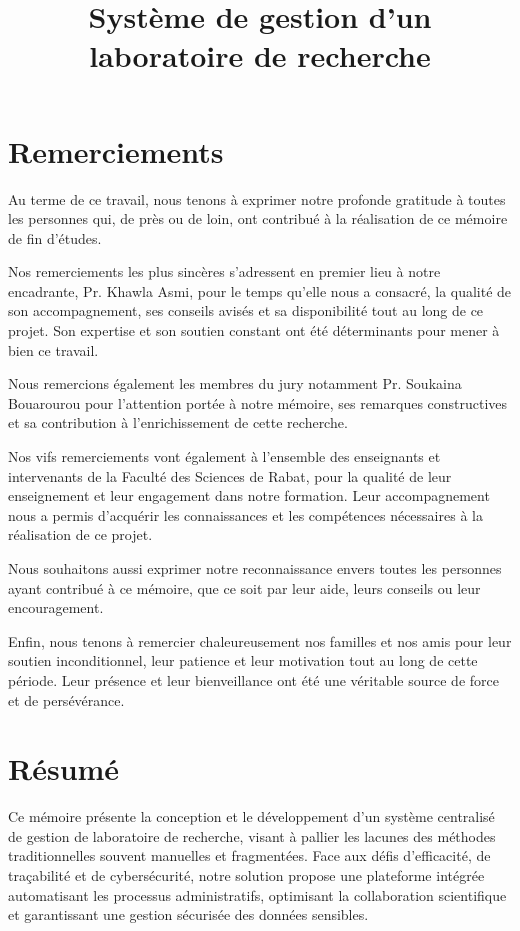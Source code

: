 \documentclass[12pt]{rapportPfe}
\title{Système de gestion d'un laboratoire de recherche}
\begin{document}

\fairepagedegarde
\fairemarges


\chapter*{Remerciements}
Au terme de ce travail, nous tenons à exprimer notre profonde gratitude à toutes les personnes qui, de près ou de loin, ont contribué à la réalisation de ce mémoire de fin d’études.

Nos remerciements les plus sincères s’adressent en premier lieu à notre encadrante, Pr. Khawla Asmi, pour le temps qu’elle nous a consacré, la qualité de son accompagnement, ses conseils avisés et sa disponibilité tout au long de ce projet. Son expertise et son soutien constant ont été déterminants pour mener à bien ce travail.

Nous remercions également les membres du jury notamment Pr. Soukaina Bouarourou pour l’attention portée à notre mémoire, ses remarques constructives et sa contribution à l’enrichissement de cette recherche.

Nos vifs remerciements vont également à l’ensemble des enseignants et intervenants de la Faculté des Sciences de Rabat, pour la qualité de leur enseignement et leur engagement dans notre formation. Leur accompagnement nous a permis d’acquérir les connaissances et les compétences nécessaires à la réalisation de ce projet.

Nous souhaitons aussi exprimer notre reconnaissance envers toutes les personnes ayant contribué à ce mémoire, que ce soit par leur aide, leurs conseils ou leur encouragement.

Enfin, nous tenons à remercier chaleureusement nos familles et nos amis pour leur soutien inconditionnel, leur patience et leur motivation tout au long de cette période. Leur présence et leur bienveillance ont été une véritable source de force et de persévérance.


\chapter*{Résumé}
Ce mémoire présente la conception et le développement d’un système centralisé de gestion de laboratoire de recherche, visant à pallier les lacunes des méthodes traditionnelles souvent manuelles et fragmentées. Face aux défis d’efficacité, de traçabilité et de cybersécurité, notre solution propose une plateforme intégrée automatisant les processus administratifs, optimisant la collaboration scientifique et garantissant une gestion sécurisée des données sensibles.
\end{document}

